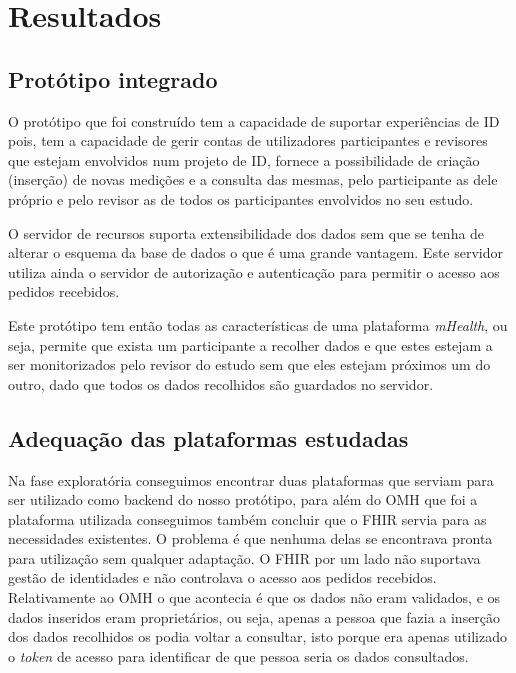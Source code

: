 \chapter{Resultados}
\section{Protótipo integrado}

O protótipo que foi construído tem a capacidade de suportar experiências de \gls{ID} pois, tem a capacidade de gerir contas de utilizadores participantes e revisores que estejam envolvidos num projeto de \gls{ID}, fornece a possibilidade de criação (inserção) de novas medições e a consulta das mesmas, pelo participante as dele próprio e pelo revisor as de todos os participantes envolvidos no seu estudo.\par
O servidor de recursos suporta extensibilidade dos dados sem que se tenha de alterar o esquema da base de dados o que é uma grande vantagem. Este servidor utiliza ainda o servidor de autorização e autenticação para permitir o acesso aos pedidos recebidos. \par
Este protótipo tem então todas as características de uma plataforma \textit{mHealth}, ou seja, permite que exista um participante a recolher dados e que estes estejam a ser monitorizados pelo revisor do estudo sem que eles estejam próximos um do outro, dado que todos os dados recolhidos são guardados no servidor.

\section{Adequação das plataformas estudadas}

Na fase exploratória conseguimos encontrar duas plataformas que serviam para ser utilizado como backend do nosso protótipo, para além do \gls{OMH} que foi a plataforma utilizada conseguimos também concluir que o \gls{FHIR} servia para as necessidades existentes. O problema é que nenhuma delas se encontrava pronta para utilização sem qualquer adaptação. O \gls{FHIR} por um lado não suportava gestão de identidades e não controlava o acesso aos pedidos recebidos. Relativamente ao \gls{OMH} o que acontecia é que os dados não eram validados, e os dados inseridos eram proprietários, ou seja, apenas a pessoa que fazia a inserção dos dados recolhidos os podia voltar a consultar, isto porque era apenas utilizado o \textit{token} de acesso para identificar de que pessoa seria os dados consultados.

